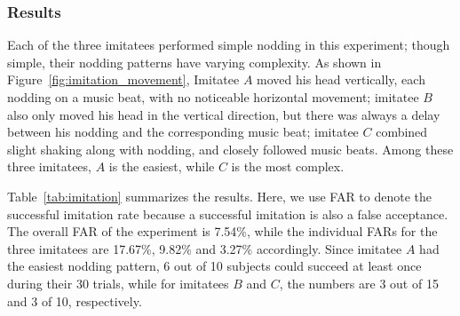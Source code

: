 \subsubsection{Results}
Each of the three imitatees performed simple nodding in this experiment; though simple, their nodding patterns have varying complexity. As shown in Figure~\ref{fig:imitation_movement}, Imitatee $A$ moved his head vertically, each nodding on a music beat, with no noticeable horizontal movement; imitatee $B$ also only moved his head in the vertical direction, but there was always a delay between his nodding and the corresponding music beat; imitatee $C$ combined slight shaking along with nodding, and closely followed music beats. Among these three imitatees, $A$ is the easiest, while $C$ is the most complex. 
 
Table~\ref{tab:imitation} summarizes the results. Here, we use FAR to denote the successful imitation rate because a successful imitation is also a false acceptance. The overall FAR of the experiment is 7.54\%, while the individual FARs for the three imitatees are 17.67\%, 9.82\% and 3.27\% accordingly.  Since imitatee $A$ had the easiest nodding pattern, 6 out of 10 subjects could succeed at least once during their 30 trials, while for imitatees $B$ and $C$, the numbers are  3 out of 15 and 3 of 10, respectively.
 



